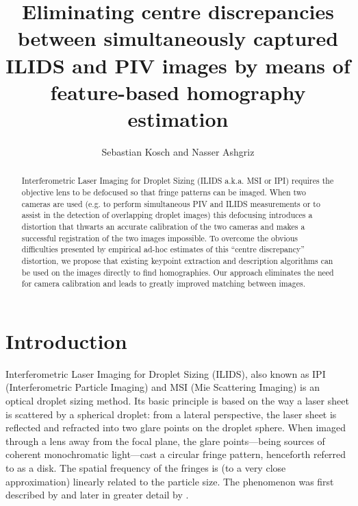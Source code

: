\documentclass[floatfix,aip,rsi,reprint,graphicx]{revtex4-1}
\begin{document}
 \title{Eliminating centre discrepancies
between simultaneously captured ILIDS and PIV images by means of feature-based 
homography estimation} \author{Sebastian Kosch and Nasser
Ashgriz}  
    \begin{abstract} Interferometric Laser Imaging for Droplet Sizing (ILIDS
        a.k.a. MSI or IPI) requires the objective lens to be defocused so that
        fringe patterns can be imaged. When two cameras are used (e.g. to
        perform simultaneous PIV and ILIDS measurements or to assist in the
        detection of overlapping droplet images) this defocusing introduces a
        distortion that thwarts an accurate calibration of the two cameras
        and makes a successful registration of the two images impossible. To
        overcome the obvious difficulties presented by empirical ad-hoc
        estimates of this ``centre discrepancy'' distortion, we propose that existing keypoint extraction and
        description algorithms can be used on the images directly to find
        homographies. Our approach eliminates the need for camera calibration and leads
        to greatly improved matching between images.
\end{abstract} \maketitle

\section{Introduction} Interferometric Laser Imaging for Droplet Sizing (ILIDS),
also known as IPI (Interferometric Particle Imaging) and MSI (Mie Scattering
Imaging) is an optical droplet sizing method. Its basic principle is based on
the way a laser sheet is scattered by a spherical droplet: from a lateral
perspective, the laser sheet is reflected and refracted into two glare points on
the droplet sphere. When imaged through a lens away from the focal plane, the
glare points---being sources of coherent monochromatic light---cast a circular
fringe pattern, henceforth referred to as a disk. The spatial frequency of the
fringes is (to a very close approximation) linearly related to the particle
size. The phenomenon was first described by \citet{Konig86} and later in greater
detail by \citet{Glover95}.
\end{document}
